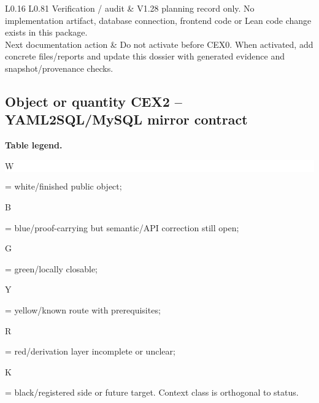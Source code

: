 \begin{longtable}{L{0.16\linewidth} L{0.81\linewidth}}
\hline\addlinespace[0.20em]
Verification /\allowbreak{} audit & V1.28 planning record only. No implementation artifact, database connection, frontend code or Lean code change exists in this package.\\
\hline\addlinespace[0.20em]
Next documentation action & Do not activate before CEX0. When activated, add concrete files/\allowbreak{}reports and update this dossier with generated evidence and snapshot/\allowbreak{}provenance checks.\\
\hline\addlinespace[0.20em]
\end{longtable}
\subsection*{Object or quantity CEX2 -- YAML2SQL/\allowbreak{}MySQL mirror contract}
\hypertarget{objproof:CEX2}{}
\par\smallskip\noindent\begin{minipage}{0.99\linewidth}\footnotesize\raggedright\textbf{Table legend.} \colorbox{white}{\strut W} = white/finished public object; \colorbox{cyan!20}{\strut B} = blue/proof-carrying but semantic/API correction still open; \colorbox{green!18}{\strut G} = green/locally closable; \colorbox{yellow!25}{\strut Y} = yellow/known route with prerequisites; \colorbox{red!20}{\strut R} = red/derivation layer incomplete or unclear; \colorbox{black!18}{\strut K} = black/registered side or future target. Context class is orthogonal to status.\end{minipage}\par\vspace{0.25em}
